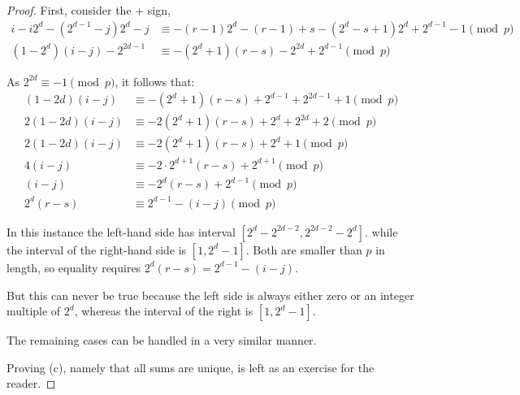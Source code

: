\begin{proof}
First, consider the + sign,
\begin{align*}
i-i2^d-(2^{d-1}-j)2^d-j &\equiv -(r-1)2^d-(r-1)+s-(2^d-s+1)2^d+2^{d-1}-1\pmod p \\
  (1-2^d)(i-j)-2^{2d-1} &\equiv -(2^d+1)(r-s)-2^{2d}+2^{d-1}\pmod p
\end{align*}

As $2^{2d} \equiv -1\pmod p$, it follows that:
\begin{align*}
  (1-2d)(i-j) &\equiv -(2^d+1)(r-s)+2^{d-1} + 2^{2d-1} + 1\pmod p \\
  2(1-2d)(i-j) &\equiv -2(2^d+1)(r-s)+2^{d} + 2^{2d} + 2\pmod p \\
  2(1-2d)(i-j) &\equiv -2(2^d+1)(r-s)+2^{d}+1\pmod p \\
  4(i-j) &\equiv -2 \cdot 2^{d+1}(r-s)+2^{d+1}\pmod p \\
  (i-j) &\equiv -2^{d}(r-s)+2^{d-1}\pmod p \\
  2^d(r-s) &\equiv 2^{d-1}-(i-j)\pmod p
\end{align*}

In this instance the left-hand side has interval
$[2^d - 2^{2d - 2}, 2^{2d - 2} - 2^d]$.
while the interval of the right-hand side is $[1, 2^d - 1]$.
Both are smaller than $p$ in length, so equality requires $2^d(r  -s) = 2^{d - 1} - (i - j)$.

But this can never be true because the left side is always either zero or an integer multiple of $2^d$, whereas the interval of the right is $[1, 2^d - 1]$.

The remaining cases can be handled in a very similar manner.

Proving (c), namely that all sums are unique, is left as an exercise for the reader.
\end{proof}

